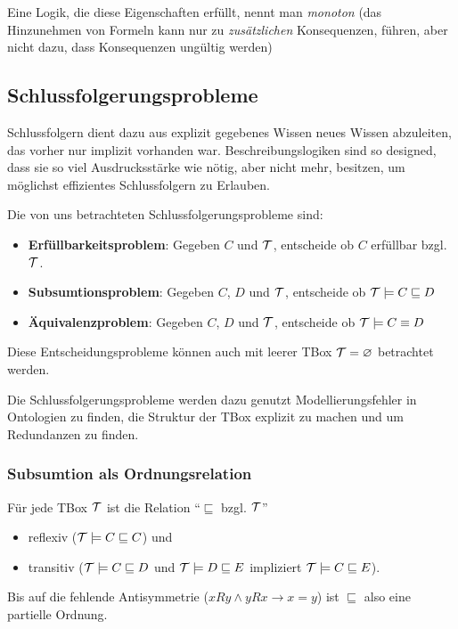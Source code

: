 Eine Logik, die diese Eigenschaften erfüllt, nennt man \emph{monoton} (das Hinzunehmen von Formeln kann nur zu \emph{zusätzlichen} Konsequenzen, führen, aber nicht dazu, dass Konsequenzen ungültig werden)

\subsection{Schlussfolgerungsprobleme}\label{schlussfolgerungsprobleme}

Schlussfolgern dient dazu aus explizit gegebenes Wissen neues Wissen abzuleiten, das vorher nur implizit vorhanden war. Beschreibungslogiken sind so designed, dass sie so viel Ausdrucksstärke wie nötig, aber nicht mehr, besitzen, um möglichst effizientes Schlussfolgern zu Erlauben.

Die von uns betrachteten Schlussfolgerungsprobleme sind:

\begin{itemize}
  \item \textbf{Erfüllbarkeitsproblem}: Gegeben $C$ und $\mathcal{T}$, entscheide ob $C$ erfüllbar bzgl. $\mathcal{T}$.
  \item \textbf{Subsumtionsproblem}: Gegeben $C$, $D$ und $\mathcal{T}$, entscheide ob $\mathcal{T} \models C \sqsubseteq D$
  \item \textbf{Äquivalenzproblem}: Gegeben $C$, $D$ und $\mathcal{T}$, entscheide ob $\mathcal{T} \models C \equiv D$
\end{itemize}

Diese Entscheidungsprobleme können auch mit leerer TBox $\mathcal{T} = \varnothing$ betrachtet werden.

Die Schlussfolgerungsprobleme werden dazu genutzt Modellierungsfehler in Ontologien zu finden, die Struktur der TBox explizit zu machen und um Redundanzen zu finden.

\subsubsection{Subsumtion als Ordnungsrelation}\label{subordn}

\begin{lemma}
    Für jede TBox $\mathcal{T}$ ist die Relation \enquote{$\sqsubseteq$ bzgl. $\mathcal{T}$}

\begin{itemize}
  \item reflexiv ($\mathcal{T} \models C \sqsubseteq C$) und
  \item transitiv ($\mathcal{T} \models C \sqsubseteq D$ und $\mathcal{T} \models D \sqsubseteq E$ impliziert $\mathcal{T} \models C \sqsubseteq E$).
\end{itemize}
Bis auf die fehlende Antisymmetrie ($xRy \wedge yRx \rightarrow x = y$) ist $\sqsubseteq$ also eine partielle Ordnung.
\end{lemma}

